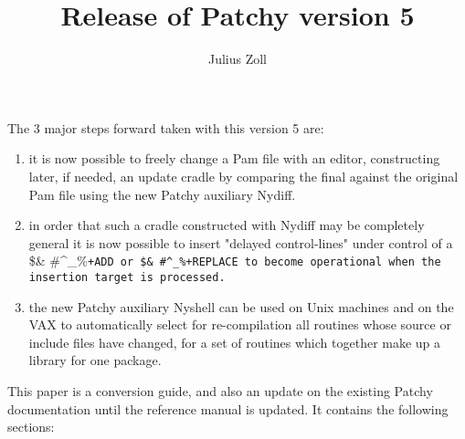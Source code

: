 \setlength{\textwidth}{16cm}
\setlength{\textheight}{24cm}
\setlength{\hoffset}{-16mm}
\setlength{\voffset}{-16mm}
\parindent 0pt
\setlength{\parskip}{5pt}
\newcommand{\Lit}[1]{\mbox{\tt #1}}
\makeatletter
\def\@m@n@sanitize{\@makeother\$\@makeother\&%
\@makeother\#\@makeother\^\@makeother\_\@makeother\%\@makeother\~}
\def\Lit{\begingroup\@m@n@sanitize\@Lit}
\def\@Lit#1{\tt{#1}\endgroup}%
\let\origverbatim\verbatim
\def\verbatim{\par\vspace*{-.4\baselineskip}\@verbatim
\frenchspacing\@vobeyspaces\verbatim@start}
\let\oldendverbatim\endverbatim
\def\endverbatim{\oldendverbatim\vspace*{-.6\baselineskip}}
\makeatother
\title{Release of Patchy version 5}
\author{Julius Zoll}

\maketitle


The 3 major steps forward taken with this version 5 are:

\begin{enumerate}

\item
it is now possible to freely change a Pam file with an editor,
constructing later, if needed, an update cradle by comparing
the final against the original Pam file using the new Patchy
auxiliary Nydiff.

\item
in order that such a cradle constructed with Nydiff may be completely
general it is now possible to insert "delayed control-lines" under
control of a \Lit{+ADD} or \Lit{+REPLACE} to become operational when the
insertion target is processed.

\item
the new Patchy auxiliary Nyshell can be used on Unix machines and
on the VAX to automatically select for re-compilation all routines whose
source or include files have changed, for a set of routines which together
make up a library for one package.
\end{enumerate}

This paper is a conversion guide, and also an update on the existing
Patchy documentation until the reference manual is updated. It contains
the following sections:


